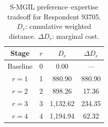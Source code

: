 \begin{table}[htbp]
\centering
\caption{S-MGIL preference--expertise tradeoff for Respondent 93705. $D_r$: cumulative weighted distance. $\Delta D_r$: marginal cost.}
\label{tab:tradeoff}
\footnotesize
\begin{tabular}{cccc}
\toprule
Stage & $r$ & $D_r$ & $\Delta D_r$ \\
\midrule
Baseline & 0 & 0.00 & --- \\
$r=1$ & 1 & 880.90 & 880.90 \\
$r=2$ & 2 & 898.26 & 17.36 \\
$r=3$ & 3 & 1,132.62 & 234.35 \\
$r=4$ & 4 & 1,194.94 & 62.32 \\
\bottomrule
\end{tabular}
\end{table}